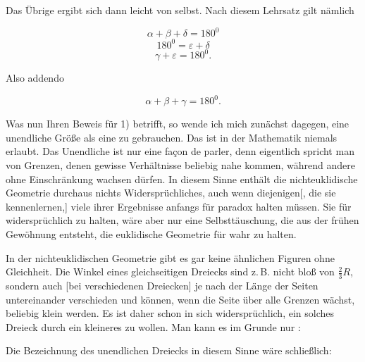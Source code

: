 

%
\noindent\begin{minipage}[t]{2.35cm}\vspace{0pt}

\end{minipage}\hfill\begin{minipage}[t]{9.9cm}\vspace{0pt}

 Das Übrige ergibt sich dann leicht von selbst. Nach diesem Lehrsatz gilt nämlich

\[
\alpha+\beta+\delta=180^0
\]
\[
180^0=\varepsilon+\delta
\]
\[
\gamma+\varepsilon=180^0.
\]

 Also addendo

\[
\alpha+\beta+\gamma=180^0.
\]

 \end{minipage}

Was nun Ihren Beweis für 1) betrifft, so wende ich mich zunächst dagegen, eine unendliche Größe als eine  zu gebrauchen. Das ist in der Mathematik niemals erlaubt. Das Unendliche ist nur eine façon de parler, denn eigentlich spricht man von Grenzen, denen gewisse Verhältnisse beliebig nahe kommen, während andere ohne Einschränkung wachsen dürfen. In diesem Sinne enthält die nichteuklidische Geometrie durchaus nichts Widersprüchliches, auch wenn diejenigen[, die sie kennenlernen,] viele ihrer Ergebnisse anfangs für paradox halten müssen. Sie für widersprüchlich zu halten, wäre aber nur eine Selbsttäuschung, die aus der frühen Gewöhnung entsteht, die euklidische Geometrie für  wahr zu halten.

In der nichteuklidischen Geometrie gibt es gar keine ähnlichen Figuren ohne Gleichheit. Die Winkel eines gleichseitigen Dreiecks sind z.\,B. nicht bloß von $\frac{2}{3}R$, sondern auch [bei verschiedenen Dreiecken] je nach der Länge der Seiten untereinander verschieden und können, wenn die Seite über alle Grenzen wächst, beliebig klein werden. Es ist daher schon in sich widersprüchlich, ein solches Dreieck durch ein kleineres  zu wollen. Man kann es im Grunde nur :

\begin{center}

\end{center}

 Die Bezeichnung des unendlichen Dreiecks in diesem Sinne wäre schließlich:

\begin{center}

\end{center}
